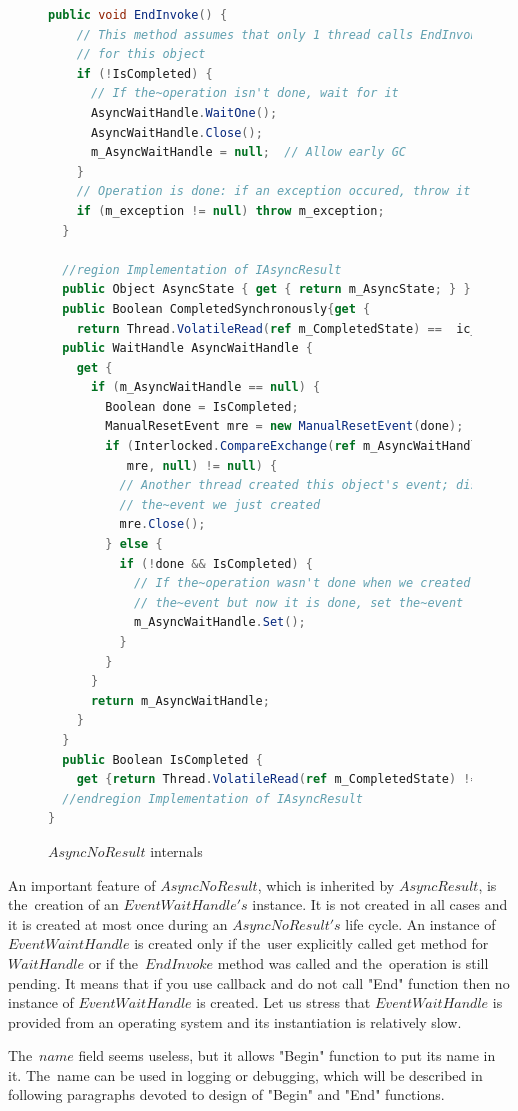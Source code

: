 \begin{figure}[!hbp]	
\begin{lstlisting}[language=cs]
  public void EndInvoke() {
    // This method assumes that only 1 thread calls EndInvoke 
    // for this object
    if (!IsCompleted) {
      // If the~operation isn't done, wait for it
      AsyncWaitHandle.WaitOne();
      AsyncWaitHandle.Close();
      m_AsyncWaitHandle = null;  // Allow early GC
    }      
    // Operation is done: if an exception occured, throw it
    if (m_exception != null) throw m_exception;
  }

  //region Implementation of IAsyncResult
  public Object AsyncState { get { return m_AsyncState; } }
  public Boolean CompletedSynchronously{get { 
    return Thread.VolatileRead(ref m_CompletedState) ==  ic_scs; }}
  public WaitHandle AsyncWaitHandle {
    get {
      if (m_AsyncWaitHandle == null) {
        Boolean done = IsCompleted;
        ManualResetEvent mre = new ManualResetEvent(done);
        if (Interlocked.CompareExchange(ref m_AsyncWaitHandle,
           mre, null) != null) {
          // Another thread created this object's event; dispose 
          // the~event we just created
          mre.Close();
        } else {
          if (!done && IsCompleted) {
            // If the~operation wasn't done when we created 
            // the~event but now it is done, set the~event
            m_AsyncWaitHandle.Set();
          }
        }
      }
      return m_AsyncWaitHandle;
    }
  }
  public Boolean IsCompleted {
    get {return Thread.VolatileRead(ref m_CompletedState) != c_sp; }}
  //endregion Implementation of IAsyncResult
}
\end{lstlisting}
\caption{$AsyncNoResult$ internals} 
\label{noresulti}
\end{figure}


  An important feature of $AsyncNoResult$, which is inherited by $AsyncResult$, is the~creation of an $EventWaitHandle's$ instance.
  It is not created in all cases and it is created at most once during an $AsyncNoResult's$ life cycle.
  An instance of $EventWaintHandle$ is created only if the~user explicitly called get method for $WaitHandle$ or
  if the~$EndInvoke$ method was called and the~operation is still pending.
  It means that if you use callback and do not call "End" function then no instance of $EventWaitHandle$ is created.
  Let us stress that $EventWaitHandle$ is provided from an operating system and its instantiation is relatively slow.

  The~$name$ field seems useless, but it allows "Begin" function to put its name in it. 
  The~name can be used in logging or debugging, 
  which will be described in following paragraphs devoted 
  to design of "Begin" and "End" functions.


